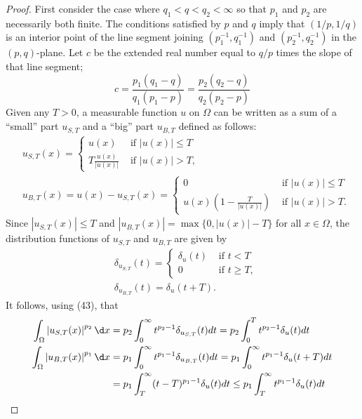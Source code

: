 \begin{proof}
  First consider the case where $q_1<q<q_2<\infty$ so that $p_1$ and $p_2$ are necessarily both finite. The conditions satisfied by $p$ and $q$ imply that $(1 / p, 1 / q)$ is an interior point of the line segment joining $\left(p_1^{-1}, q_1^{-1}\right)$ and $\left(p_2^{-1}, q_2^{-1}\right)$ in the $(p, q)$-plane. Let $c$ be the extended real number equal to $q / p$ times the slope of
  that line segment;
  \[
  c=\frac{p_1\left(q_1-q\right)}{q_1\left(p_1-p\right)}=\frac{p_2\left(q_2-q\right)}{q_2\left(p_2-p\right)}
  \]
  Given any $T>0$, a measurable function $u$ on $\Omega$ can be written as a sum of a ``small'' part $u_{S, T}$ and a ``big'' part $u_{B, T}$ defined as follows:
  \[
  \begin{aligned}
  & u_{S, T}(x)= \begin{cases}u(x) & \text { if }|u(x)| \leq T \\
  T \frac{u(x)}{|u(x)|} & \text { if }|u(x)|>T,\end{cases} \\
  & u_{B, T}(x)=u(x)-u_{S, T}(x)= \begin{cases}0 & \text { if }|u(x)| \leq T \\
  u(x)\left(1-\frac{T}{|u(x)|}\right) & \text { if }|u(x)|>T .\end{cases}
  \end{aligned}
  \]
  Since $\left|u_{S, T}(x)\right| \leq T$ and $\left|u_{B, T}(x)\right|=\max \{0,|u(x)|-T\}$ for all $x \in \Omega$, the distribution functions of $u_{S, T}$ and $u_{B, T}$ are given by
  \[
  \begin{aligned}
  & \delta_{u_{S, T}}(t)= \begin{cases}\delta_u(t) & \text { if } t<T \\
  0 & \text { if } t \geq T,\end{cases} \\
  & \delta_{u_{B, T}}(t)=\delta_u(t+T) .
  \end{aligned}
  \]
  It follows, using (43), that
  \[
  \begin{aligned}
  \int_{\Omega}\left|u_{S, T}(x)\right|^{p_2} \d x & =p_2 \int_0^{\infty} t^{p_2-1} \delta_{u_{S, T}}(t) d t=p_2 \int_0^T t^{p_2-1} \delta_u(t) d t \\
  \int_{\Omega}\left|u_{B, T}(x)\right|^{p_1} \d x & =p_1 \int_0^{\infty} t^{p_1-1} \delta_{u_{B, T}}(t) d t=p_1 \int_0^{\infty} t^{p_1-1} \delta_u(t+T) d t \\
  & =p_1 \int_T^{\infty}(t-T)^{p_1-1} \delta_u(t) d t \leq p_1 \int_T^{\infty} t^{p_1-1} \delta_u(t) d t

\end{aligned}\]
\end{proof}
